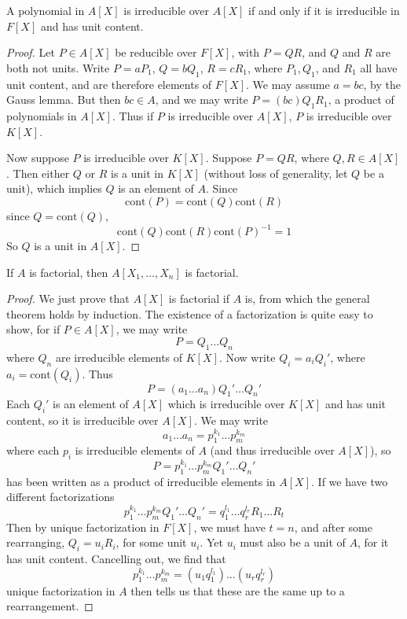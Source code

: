 \begin{corollary}
    A polynomial in $A[X]$ is irreducible over $A[X]$ if and only if it is irreducible in $F[X]$ and has unit content.
\end{corollary}
\begin{proof}
    Let $P \in A[X]$ be reducible over $F[X]$, with $P = QR$, and $Q$ and $R$ are both not units. Write $P = aP_1$, $Q = bQ_1$, $R = cR_1$, where $P_1, Q_1$, and $R_1$ all have unit content, and are therefore elements of $F[X]$. We may assume $a = bc$, by the Gauss lemma. But then $bc \in A$, and we may write $P = (bc) Q_1 R_1$, a product of polynomials in $A[X]$. Thus if $P$ is irreducible over $A[X]$, $P$ is irreducible over $K[X]$.

    Now suppose $P$ is irreducible over $K[X]$. Suppose $P = QR$, where $Q, R \in A[X]$. Then either $Q$ or $R$ is a unit in $K[X]$ (without loss of generality, let $Q$ be a unit), which implies $Q$ is an element of $A$. Since
    \[ \text{cont}(P) = \text{cont}(Q) \text{cont}(R) \]
    since $Q = \text{cont}(Q)$,
    \[ \text{cont}(Q) \text{cont}(R) \text{cont}(P)^{-1} = 1 \]
    So $Q$ is a unit in $A[X]$.
\end{proof}

\begin{corollary}
    If $A$ is factorial, then $A[X_1, \dots, X_n]$ is factorial.
\end{corollary}
\begin{proof}
    We just prove that $A[X]$ is factorial if $A$ is, from which the general theorem holds by induction. The existence of a factorization is quite easy to show, for if $P \in A[X]$, we may write
    \[ P = Q_1 \dots Q_n \]
    where $Q_n$ are irreducible elements of $K[X]$. Now write $Q_i = a_i Q_i'$, where $a_i = \text{cont}(Q_i)$. Thus
    \[ P = (a_1 \dots a_n) Q_1' \dots Q_n' \]
    Each $Q_i'$ is an element of $A[X]$ which is irreducible over $K[X]$ and has unit content, so it is irreducible over $A[X]$. We may write
    \[ a_1 \dots a_n = p_1^{k_1} \dots p_m^{k_m} \]
    where each $p_i$ is irreducible elements of $A$ (and thus irreducible over $A[X]$), so
    \[ P = p_1^{k_1} \dots p_m^{k_m} Q_1' \dots Q_n' \]
    has been written as a product of irreducible elements in $A[X]$. If we have two different factorizations
    \[ p_1^{k_1} \dots p_m^{k_m} Q_1' \dots Q_n' = q_1^{l_1} \dots q_r^{l_r} R_1 \dots R_t \]
    Then by unique factorization in $F[X]$, we must have $t = n$, and after some rearranging, $Q_i = u_i R_i$, for some unit $u_i$. Yet $u_i$ must also be a unit of $A$, for it has unit content. Cancelling out, we find that
    \[ p_1^{k_1} \dots p_m^{k_m} = (u_1 q_1^{l_1}) \dots (u_r q_r^{l_r}) \]
    unique factorization in $A$ then tells us that these are the same up to a rearrangement.
\end{proof}

